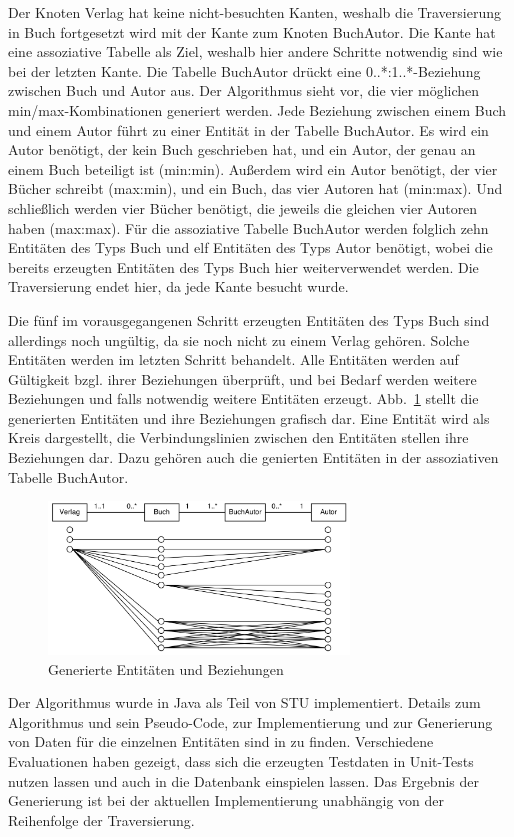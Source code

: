   Der Knoten Verlag hat keine nicht-besuchten Kanten, weshalb die Traversierung in Buch fortgesetzt wird mit der Kante zum Knoten
	BuchAutor. Die Kante hat eine assoziative Tabelle als Ziel, weshalb hier andere Schritte notwendig sind wie bei der letzten Kante.
	Die Tabelle BuchAutor drückt eine 0..*:1..*-Beziehung zwischen Buch und Autor aus. Der Algorithmus sieht vor, die vier möglichen
	min/max-Kombinationen generiert werden. Jede Beziehung zwischen einem Buch und einem Autor führt zu einer Entität in der Tabelle
	BuchAutor. Es wird ein Autor benötigt, der kein Buch geschrieben hat, und ein Autor, der genau an einem
	Buch beteiligt ist (min:min). Außerdem wird ein Autor benötigt, der vier Bücher schreibt (max:min), und ein Buch, das vier Autoren
	hat (min:max). Und schließlich werden vier Bücher benötigt, die jeweils die gleichen vier Autoren haben (max:max). Für die assoziative
	Tabelle BuchAutor werden folglich zehn Entitäten des Typs Buch und elf Entitäten des Typs Autor benötigt, wobei die bereits erzeugten
	Entitäten des Typs Buch hier weiterverwendet werden. Die Traversierung endet hier, da jede Kante besucht wurde.
	
	Die fünf im vorausgegangenen Schritt erzeugten Entitäten des Typs Buch sind allerdings noch ungültig, da sie noch nicht zu einem Verlag
	gehören. Solche Entitäten werden im letzten Schritt behandelt. Alle Entitäten werden auf Gültigkeit bzgl. ihrer Beziehungen überprüft,
	und bei Bedarf werden weitere Beziehungen und falls notwendig weitere Entitäten erzeugt. Abb.~\ref{generiert} stellt die generierten
	Entitäten und ihre Beziehungen grafisch dar. Eine Entität wird als Kreis dargestellt, die Verbindungslinien zwischen den Entitäten
	stellen ihre Beziehungen dar. Dazu gehören auch die genierten Entitäten in der assoziativen Tabelle BuchAutor.
		
	\begin{figure}[htb]
		\begin{center}
			\includegraphics[width=8cm]{images/generiert.png}
			\caption{\label{generiert}Generierte Entitäten und Beziehungen}
		\end{center}
	\end{figure}
	
	Der Algorithmus wurde in Java als Teil von STU implementiert. Details zum Algorithmus und sein Pseudo-Code, zur Implementierung und zur
	Generierung von Daten für die einzelnen Entitäten sind in \cite{MT:Moll:2013} zu finden. Verschiedene Evaluationen haben gezeigt, dass
	sich die erzeugten Testdaten in Unit-Tests nutzen lassen und auch in die Datenbank einspielen lassen. Das Ergebnis der Generierung ist
	bei der aktuellen Implementierung unabhängig von der Reihenfolge der Traversierung.
	
	

